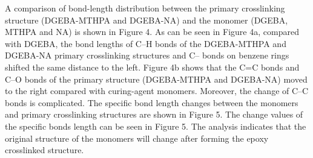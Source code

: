 \documentclass{article}
\begin{document}
A comparison of bond-length distribution between the primary crosslinking structure (DGEBA-MTHPA and DGEBA-NA) and the monomer (DGEBA, MTHPA and NA) is shown in Figure 4. As can be seen in Figure 4a, compared with DGEBA, the bond lengths of C–H bonds of the DGEBA-MTHPA and DGEBA-NA primary crosslinking structures and C– bonds on benzene rings shifted the same distance to the left. Figure 4b shows that the C=C bonds and C–O bonds of the primary structure (DGEBA-MTHPA and DGEBA-NA) moved to the right compared with curing-agent monomers. Moreover, the change of C–C bonds is complicated. The specific bond length changes between the monomers and primary crosslinking structures are shown in Figure 5. The change values of the specific bonds length can be seen in Figure 5. The analysis indicates that the original structure of the monomers will change after forming the epoxy crosslinked structure.
\end{document}
